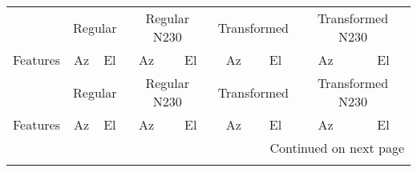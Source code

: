 \begin{longtable}{|lcccccccc|}
    \toprule
    \label{tab:exp2_top50_features}
    & \multicolumn{2}{c}{Regular} & \multicolumn{2}{c}{Regular N230} & \multicolumn{2}{c}{Transformed} & \multicolumn{2}{c|}{Transformed N230}\\
    \cmidrule(lr){2-3} \cmidrule(lr){4-5} \cmidrule(lr){6-7} \cmidrule(lr){8-9}
    Features & Az & El & Az & El & Az & El & Az & El \\  \hline
    \endfirsthead
    
    \toprule
    & \multicolumn{2}{c}{Regular} & \multicolumn{2}{c}{Regular N230} & \multicolumn{2}{c}{Transformed} & \multicolumn{2}{c|}{Transformed N230}\\
    \cmidrule(lr){2-3} \cmidrule(lr){4-5} \cmidrule(lr){6-7} \cmidrule(lr){8-9}
    Features & Az & El & Az & El & Az & El & Az & El \\ \hline
    \endhead
    \multicolumn{9}{r}{{Continued on next page}} \\
    \midrule
    \endfoot
    

\end{longtable}
